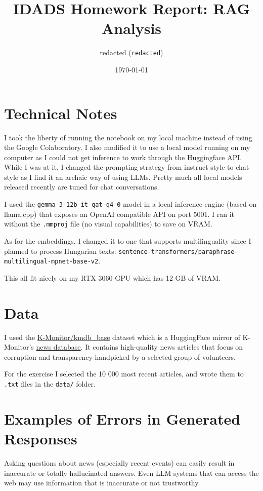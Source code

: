 \documentclass{article}
\title{IDADS Homework Report: RAG Analysis}
\author{redacted (\texttt{redacted})}
\date{\today}
\begin{document}
\maketitle

\section{Technical Notes}

I took the liberty of running the notebook on my local machine instead of using the Google Colaboratory. I also modified it to use a local model running on my computer as I could not get inference to work through the Huggingface API. While I was at it, I changed the prompting strategy from instruct style to chat style as I find it an archaic way of using LLMs. Pretty much all local models released recently are tuned for chat conversations.

I used the \texttt{gemma-3-12b-it-qat-q4\_0} model in a local inference engine (based on llama.cpp) that exposes an OpenAI compatible API on port 5001. I ran it without the \texttt{.mmproj} file (no visual capabilities) to save on VRAM.

As for the embeddings, I changed it to one that supports multilinguality since I planned to process Hungarian texts: \texttt{sentence-transformers/paraphrase-multilingual-mpnet-base-v2}.

This all fit nicely on my RTX 3060 GPU which has 12 GB of VRAM.

\section{Data}

I used the \href{https://huggingface.co/datasets/K-Monitor/kmdb_base}{K-Monitor/kmdb\_base} dataset which is a HuggingFace mirror of K-Monitor's \href{https://adatbazis.k-monitor.hu/}{news database}. It contains high-quality news articles that focus on corruption and transparency handpicked by a selected group of volunteers.

For the exercise I selected the 10 000 most recent articles, and wrote them to \texttt{.txt} files in the \texttt{data/} folder.

\section{Examples of Errors in Generated Responses}

Asking questions about news (especially recent events) can easily result in inaccurate or totally hallucinated answers. Even LLM systems that can access the web may use information that is inaccurate or not trustworthy.
\end{document}

